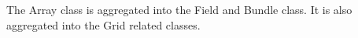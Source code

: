 

The Array class is
aggregated into the Field and Bundle class.  It is also
aggregated into the Grid related classes.

